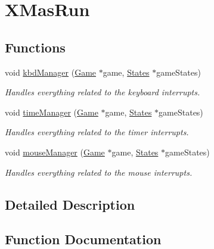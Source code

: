 \hypertarget{group___x_mas_run}{}\section{X\+Mas\+Run}
\label{group___x_mas_run}
\subsection*{Functions}
\begin{DoxyCompactItemize}
\item 
void \hyperlink{group___x_mas_run_gaa46516fec27d26c19d267394d5b2d9db}{kbd\+Manager} (\hyperlink{struct_game}{Game} $\ast$game, \hyperlink{struct_states}{States} $\ast$game\+States)
\begin{DoxyCompactList}\small\item\em Handles everything related to the keyboard interrupts. \end{DoxyCompactList}\item 
void \hyperlink{group___x_mas_run_gaa7d8686bcb6a92421aeba74757c6cabb}{time\+Manager} (\hyperlink{struct_game}{Game} $\ast$game, \hyperlink{struct_states}{States} $\ast$game\+States)
\begin{DoxyCompactList}\small\item\em Handles everything related to the timer interrupts. \end{DoxyCompactList}\item 
void \hyperlink{group___x_mas_run_ga1b1dcdb3762a6408c2b5ad053e0848eb}{mouse\+Manager} (\hyperlink{struct_game}{Game} $\ast$game, \hyperlink{struct_states}{States} $\ast$game\+States)
\begin{DoxyCompactList}\small\item\em Handles everything related to the mouse interrupts. \end{DoxyCompactList}\end{DoxyCompactItemize}


\subsection{Detailed Description}


\subsection{Function Documentation}
\mbox{\label{group___x_mas_run_gaa46516fec27d26c19d267394d5b2d9db}} 
